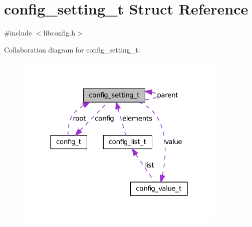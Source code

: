 \hypertarget{structconfig__setting__t}{
\section{config\_\-setting\_\-t Struct Reference}
\label{structconfig__setting__t}
}


{\ttfamily \#include $<$libconfig.h$>$}



Collaboration diagram for config\_\-setting\_\-t:
\nopagebreak
\begin{figure}[H]
\begin{center}
\leavevmode
\includegraphics[width=284pt]{structconfig__setting__t__coll__graph}
\end{center}
\end{figure}

